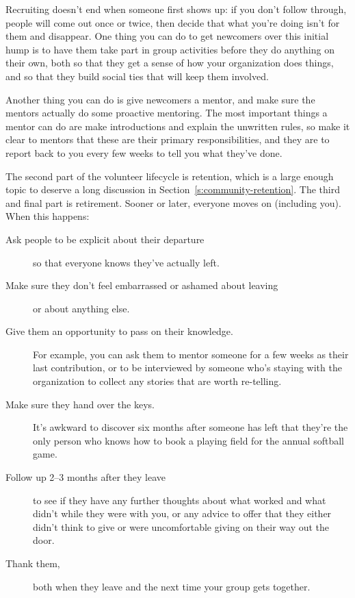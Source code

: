Recruiting doesn't end when someone first shows up: if you don't follow
through, people will come out once or twice, then decide that what
you're doing isn't for them and disappear. One thing you can do to get
newcomers over this initial hump is to have them take part in group
activities before they do anything on their own, both so that they get a
sense of how your organization does things, and so that they build
social ties that will keep them involved.

Another thing you can do is give newcomers a mentor, and make sure the
mentors actually do some proactive mentoring. The most important things
a mentor can do are make introductions and explain the unwritten rules,
so make it clear to mentors that these are their primary
responsibilities, and they are to report back to you every few weeks to
tell you what they've done.

The second part of the volunteer lifecycle is retention, which is a
large enough topic to deserve a long discussion in
Section~\ref{s:community-retention}. The third and final part is
retirement. Sooner or later, everyone moves on (including you). When
this happens:

\begin{description}
\item[Ask people to be explicit about their departure]
so that everyone knows they've actually left.
\item[Make sure they don't feel embarrassed or ashamed about leaving]
or about anything else.
\item[Give them an opportunity to pass on their knowledge.]
For example, you can ask them to mentor someone for a few weeks as
their last contribution, or to be interviewed by someone who's
staying with the organization to collect any stories that are worth
re-telling.
\item[Make sure they hand over the keys.]
It's awkward to discover six months after someone has left that
they're the only person who knows how to book a playing field for
the annual softball game.
\item[Follow up 2--3 months after they leave]
to see if they have any further thoughts about what worked and what
didn't while they were with you, or any advice to offer that they
either didn't think to give or were uncomfortable giving on their
way out the door.
\item[Thank them,]
both when they leave and the next time your group gets together.
\end{description}

